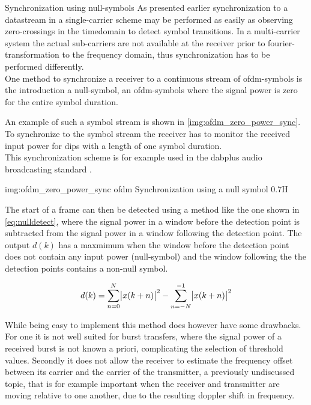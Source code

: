 \begin{subchapter}{Synchronization using null-symbols}
  As presented earlier synchronization to a datastream in a single-carrier scheme
  may be performed as easily as observing zero-crossings in the
  timedomain to detect symbol transitions.
  In a multi-carrier system the actual sub-carriers are not available
  at the receiver prior to fourier-transformation to the
  frequency domain, thus synchronization has to be performed
  differently. \\

  One method to synchronize a receiver to a continuous stream
  of \gls{ofdm}-symbols is the introduction a null-symbol,
  an \gls{ofdm}-symbols where the signal power is zero for the
  entire symbol duration.

  An example of such a symbol stream is shown in
  \autoref{img:ofdm_zero_power_sync}.
  To synchronize to the symbol stream the receiver has
  to monitor the received input power for dips with a
  length of one symbol duration. \\

  This synchronization scheme is for example used in
  the \acrshort{dabplus} audio broadcasting standard \cite{dabstandard}.

               {img:ofdm_zero_power_sync}
               {\acrshort{ofdm} Synchronization using a null symbol}
               {0.7}{H}

  The start of a frame can then be detected using
  a method like the one shown in \autoref{eq:nulldetect},
  where the signal power in a window before the detection point
  is subtracted from the signal power in a window following the detection point.
  The output $d(k)$ has a maxmimum when the window before the detection
  point does not contain any input power (null-symbol) and
  the window following the the detection points contains a
  non-null symbol.

  \begin{equation}
    \label{eq:nulldetect}
    d(k)= \sum_{n=0}^{N} \abs{x(k+n)}^2 - \sum_{n=-N}^{-1} \abs{x(k+n)}^2
  \end{equation}

  While being easy to implement this method does however
  have some drawbacks.
  For one it is not well suited for burst transfers,
  where the signal power of a received burst is not
  known a priori, complicating the selection of threshold
  values.
  Secondly it does not allow the receiver to estimate the
  frequency offset between its carrier and the carrier of the
  transmitter, a previously undiscussed topic, that is
  for example important when the receiver and transmitter
  are moving relative to one another, due to the resulting doppler
  shift in frequency.
\end{subchapter}

